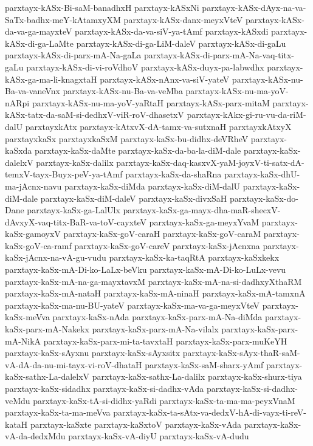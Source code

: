 {parxtayx-kASx-Bi-saM-banadhxH
parxtayx-kASxNi
parxtayx-kASx-dAyx-na-va-SaTx-badhx-meY-kAtamxyXM
parxtayx-kASx-danx-meyxVteV
parxtayx-kASx-da-va-ga-mayxteV
parxtayx-kASx-da-va-siV-ya-tAmf
parxtayx-kASxdi
parxtayx-kASx-di-ga-LaMte
parxtayx-kASx-di-ga-LiM-daleV
parxtayx-kASx-di-gaLu
parxtayx-kASx-di-parx-mA-Na-gaLa
parxtayx-kASx-di-parx-mA-Na-vaq-titx-gaLu
parxtayx-kASx-di-vi-roVdhoV
parxtayx-kASx-duyx-pa-labwdhx
parxtayx-kASx-ga-ma-li-knagxtaH
parxtayx-kASx-nAnx-va-siV-yateV
parxtayx-kASx-nu-Ba-va-vaneVnx
parxtayx-kASx-nu-Ba-va-veMba
parxtayx-kASx-nu-ma-yoV-nARpi
parxtayx-kASx-nu-ma-yoV-yaRtaH
parxtayx-kASx-parx-mitaM
parxtayx-kASx-tatx-da-saM-si-dedhxV-viR-roV-dhasetxV
parxtayx-kAkx-gi-ru-vu-da-riM-dalU
parxtayxkAtx
parxtayx-kAtxvX-dA-tamx-va-sutxnaH
parxtayxkAtxyX
parxtayxkaSx
parxtayxkaSxM
parxtayx-kaSx-bu-didhx-deVRheV
parxtayx-kaSxda
parxtayx-kaSx-daMte
parxtayx-kaSx-da-ba-la-diM-dale
parxtayx-kaSx-dalelxV
parxtayx-kaSx-dalilx
parxtayx-kaSx-daq-kasxvX-yaM-joyxV-ti-satx-dA-temxV-tayx-Buyx-peV-ya-tAmf
parxtayx-kaSx-da-shaRna
parxtayx-kaSx-dhU-ma-jAcnx-navu
parxtayx-kaSx-diMda
parxtayx-kaSx-diM-dalU
parxtayx-kaSx-diM-dale
parxtayx-kaSx-diM-daleV
parxtayx-kaSx-divxSaH
parxtayx-kaSx-do-Dane
parxtayx-kaSx-ga-LalUlx
parxtayx-kaSx-ga-mayx-dha-maR-shecxV-dAvxyX-vaq-titx-BaR-va-toV-cayxteV
parxtayx-kaSx-ga-meyxYvaM
parxtayx-kaSx-gamoyxV
parxtayx-kaSx-goV-caraH
parxtayx-kaSx-goV-caraM
parxtayx-kaSx-goV-ca-ramf
parxtayx-kaSx-goV-careV
parxtayx-kaSx-jAcnxna
parxtayx-kaSx-jAcnx-na-vA-gu-vudu
parxtayx-kaSx-ka-taqRtA
parxtayx-kaSxkekx
parxtayx-kaSx-mA-Di-ko-LaLx-beVku
parxtayx-kaSx-mA-Di-ko-LuLx-vevu
parxtayx-kaSx-mA-na-ga-mayxtavxM
parxtayx-kaSx-mA-na-si-dadhxyXthaRM
parxtayx-kaSx-mA-nataH
parxtayx-kaSx-mA-ninaH
parxtayx-kaSx-mA-tamxnA
parxtayx-kaSx-ma-nu-BU-yateV
parxtayx-kaSx-ma-va-ga-meyxVteV
parxtayx-kaSx-meVva
parxtayx-kaSx-nAda
parxtayx-kaSx-parx-mA-Na-diMda
parxtayx-kaSx-parx-mA-Nakekx
parxtayx-kaSx-parx-mA-Na-vilalx
parxtayx-kaSx-parx-mA-NikA
parxtayx-kaSx-parx-mi-ta-tavxtaH
parxtayx-kaSx-parx-muKeYH
parxtayx-kaSx-sAyxnu
parxtayx-kaSx-sAyxsitx
parxtayx-kaSx-sAyx-thaR-saM-vA-dA-da-nu-mi-tayx-vi-roV-dhataH
parxtayx-kaSx-saM-sharx-yAmf
parxtayx-kaSx-sathx-La-dalelxV
parxtayx-kaSx-sathx-La-dalilx
parxtayx-kaSx-shurx-tiya
parxtayx-kaSx-sidadhx
parxtayx-kaSx-si-dadhx-vAda
parxtayx-kaSx-si-dadhx-veMdu
parxtayx-kaSx-tA-si-didhx-yaRdi
parxtayx-kaSx-ta-ma-ma-peyxVnaM
parxtayx-kaSx-ta-ma-meVva
parxtayx-kaSx-ta-sAtx-va-dedxV-hA-di-vayx-ti-reV-kataH
parxtayx-kaSxte
parxtayx-kaSxtoV
parxtayx-kaSx-vAda
parxtayx-kaSx-vA-da-dedxMdu
parxtayx-kaSx-vA-diyU
parxtayx-kaSx-vA-dudu
}
